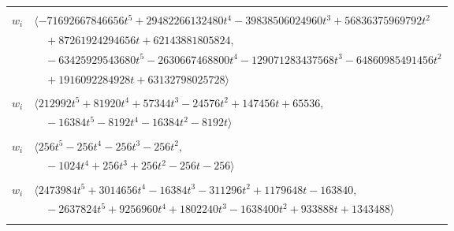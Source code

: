 \documentclass[11pt]{article}
\begin{document}
\begin{longtable}{@{}ll@{}}
\addlinespace[2pt]
\multicolumn{2}{@{}p{0.97\textwidth}@{}}{$i=15$, $D_i=536870912$, $\rho_{ij}$: $0{:}2, \allowbreak 6{:}1, \allowbreak 13{:}1, \allowbreak 21{:}1, \allowbreak 25{:}2, \allowbreak 35{:}1, \allowbreak 39{:}1, \allowbreak 41{:}1, \allowbreak 45{:}2, \allowbreak 46{:}1, \allowbreak 47{:}2, \allowbreak 60{:}2, \allowbreak 64{:}2, \allowbreak 70{:}2, \allowbreak 72{:}2, \allowbreak 74{:}2$}\\
$w_i$ & $\langle -71692667846656t^{5}+29482266132480t^{4}-39838506024960t^{3}+56836375969792t^{2}$\\
 & $\quad +87261924294656t+62143881805824,$\\
 & $\quad -63425929543680t^{5}-2630667468800t^{4}-129071283437568t^{3}-64860985491456t^{2}$\\
 & $\quad +1916092284928t+63132798025728\rangle$\\
\addlinespace[2pt]
\multicolumn{2}{@{}p{0.97\textwidth}@{}}{$i=16$, $D_i=4096$, $\rho_{ij}$: $1{:}2, \allowbreak 5{:}1, \allowbreak 13{:}2, \allowbreak 33{:}2, \allowbreak 37{:}2, \allowbreak 40{:}1, \allowbreak 53{:}2, \allowbreak 74{:}2$}\\
$w_i$ & $\langle 212992t^{5}+81920t^{4}+57344t^{3}-24576t^{2}+147456t+65536,$\\
 & $\quad -16384t^{5}-8192t^{4}-16384t^{2}-8192t\rangle$\\
\addlinespace[2pt]
\multicolumn{2}{@{}p{0.97\textwidth}@{}}{$i=17$, $D_i=256$, $\rho_{ij}$: $2{:}1, \allowbreak 4{:}1, \allowbreak 14{:}1, \allowbreak 33{:}1, \allowbreak 39{:}2, \allowbreak 48{:}2, \allowbreak 56{:}1$}\\
$w_i$ & $\langle 256t^{5}-256t^{4}-256t^{3}-256t^{2},$\\
 & $\quad -1024t^{4}+256t^{3}+256t^{2}-256t-256\rangle$\\
\addlinespace[2pt]
\multicolumn{2}{@{}p{0.97\textwidth}@{}}{$i=18$, $D_i=16384$, $\rho_{ij}$: $5{:}1, \allowbreak 7{:}2, \allowbreak 31{:}1, \allowbreak 32{:}1, \allowbreak 34{:}2, \allowbreak 35{:}1, \allowbreak 41{:}1, \allowbreak 42{:}2, \allowbreak 46{:}1, \allowbreak 49{:}2, \allowbreak 60{:}2, \allowbreak 75{:}1$}\\
$w_i$ & $\langle 2473984t^{5}+3014656t^{4}-16384t^{3}-311296t^{2}+1179648t-163840,$\\
 & $\quad -2637824t^{5}+9256960t^{4}+1802240t^{3}-1638400t^{2}+933888t+1343488\rangle$\\
\addlinespace[2pt]
\multicolumn{2}{@{}p{0.97\textwidth}@{}}{$i=19$, $D_i=32$, $\rho_{ij}$: $10{:}1, \allowbreak 14{:}1, \allowbreak 20{:}2, \allowbreak 22{:}2, \allowbreak 24{:}2, \allowbreak 35{:}1, \allowbreak 39{:}1, \allowbreak 47{:}2, \allowbreak 54{:}1, \allowbreak 61{:}1, \allowbreak 66{:}1, \allowbreak 75{:}2$}\\

\end{longtable}
\end{document}
